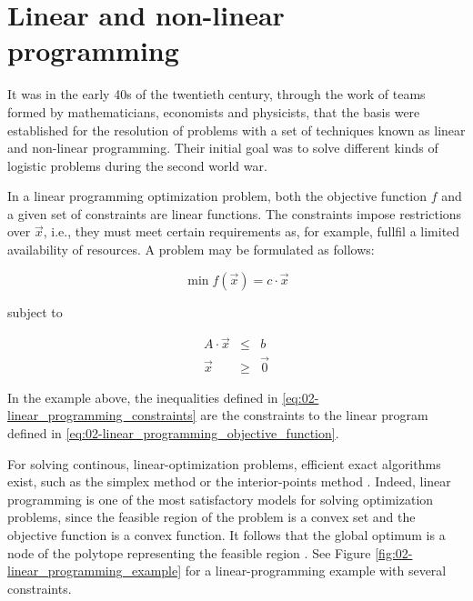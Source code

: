 \section{Linear and non-linear programming}

It was in the early 40s of the twentieth century, through the work
of teams formed by mathematicians, economists and physicists, that
the basis were established for the resolution of problems with a set
of techniques known as linear and non-linear programming. Their initial
goal was to solve different kinds of logistic problems during the
second world war.

In a linear programming optimization problem, both the objective function
$f$ and a given set of constraints are linear functions. The constraints
impose restrictions over $\vec{x}$, i.e., they must meet certain
requirements as, for example, fullfil a limited availability of resources.
A problem may be formulated as follows:

\begin{equation}
\min f(\vec{x})=c\cdot\vec{x}\label{eq:02-linear_programming_objective_function}
\end{equation}


\noindent subject to

\begin{eqnarray}
A\cdot\vec{x} & \le & b\label{eq:02-linear_programming_constraints}\\
\vec{x} & \ge & \vec{0}\nonumber 
\end{eqnarray}


\noindent In the example above, the inequalities defined in \ref{eq:02-linear_programming_constraints}
are the constraints to the linear program defined in \ref{eq:02-linear_programming_objective_function}.

For solving continous, linear-optimization problems, efficient exact
algorithms exist, such as the simplex method \cite{Dantzig-Maximization_of_a_linear_function_of_variables_subject_to_linear_inequalities:1951}
or the interior-points method \cite{Karmarkar-A_new_polynomial_time_algorithm_for_linear_programming:1984}.
Indeed, linear programming is one of the most satisfactory models
for solving optimization problems, since the feasible region of the
problem is a convex set and the objective function is a convex function.
It follows that the global optimum is a node of the polytope representing
the feasible region \cite{Talbi_Metaheuristics:2009}. See Figure
\ref{fig:02-linear_programming_example} for a linear-programming
example with several constraints.

